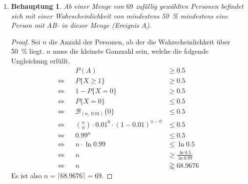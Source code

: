 \documentclass[a4paper]{scrartcl}
\newtheorem*{behaupt}{Behauptung}
\newcommand{\gdw}{\Leftrightarrow}
\begin{document}
\begin{enumerate}[label=\bfseries\arabic*.]
\begin{enumerate}
            \item
                \begin{behaupt}
                    Ab einer Menge von $69$ zufällig gewählten Personen
                    befindet sich mit einer Wahrscheinlichkeit von mindestens
                    \SI{50}{\percent} mindestens eine Person mit AB- in dieser
                    Menge (Ereignis $A$).
                \end{behaupt}
                \begin{proof}
                    Sei $n$ die Anzahl der Personen, ab der die Wahrscheinlichkeit
                    über \SI{50}{\percent} liegt.
                    $n$ muss die kleinste Ganzzahl sein, welche die folgende
                    Ungleichung erfüllt.
                    \begin{equation*}
                        \begin{aligned}
                            && P(A) &\geq \num{0,5} \\
                            \gdw && P\{X \geq 1\} &\geq \num{0,5} \\
                            \gdw && 1 - P\{X = 0\} &\geq \num{0,5} \\
                            \gdw && P\{X = 0\} &\leq \num{0,5} \\
                            \gdw && \mathcal{B}_{(n,\ \num{0.01})}\{0\}
                                    &\leq \num{0,5} \\
                            \gdw && \binom{n}{0} \cdot \num{0,01}^0 \cdot
                                    (1 - \num{0,01})^{n - 0} &\leq \num{0,5} \\
                            \gdw && \num{0,99}^n &\leq \num{0,5} \\
                            \gdw && n \cdot \ln \num{0,99}
                                    &\leq \ln \num{0,5} \\
                            \gdw && n &\geq \frac{\ln \num{0,5}}{\ln \num{0,99}}
                                    \\
                            \gdw && n &\gtrapprox \num{68.9676}
                        \end{aligned}
                    \end{equation*}
                    Es ist also $n = \lceil \num{68,9676} \rceil = 69$.


\end{proof}
\end{enumerate}
\end{enumerate}
\end{document}
